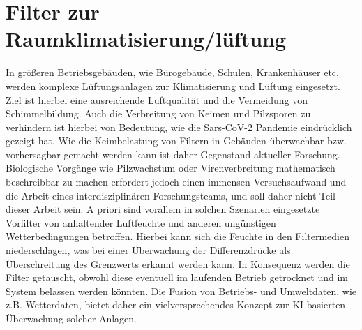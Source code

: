 \section{Filter zur Raumklimatisierung/lüftung}
In größeren Betriebsgebäuden, wie Bürogebäude, Schulen, Krankenhäuser etc. werden komplexe Lüftungsanlagen zur Klimatisierung und Lüftung eingesetzt. Ziel ist hierbei eine ausreichende Luftqualität und die Vermeidung von Schimmelbildung. Auch die Verbreitung von Keimen und Pilzsporen zu verhindern ist hierbei von Bedeutung, wie die Sars-CoV-2 Pandemie eindrücklich gezeigt hat.
Wie die Keimbelastung von Filtern in Gebäuden überwachbar bzw. vorhersagbar gemacht werden kann ist daher Gegenstand aktueller Forschung. Biologische Vorgänge wie Pilzwachstum oder Virenverbreitung mathematisch beschreibbar zu machen erfordert jedoch einen immensen Versuchsaufwand und die Arbeit eines interdisziplinären Forschungsteams, und soll daher nicht Teil dieser Arbeit sein.\newline
A priori sind vorallem in solchen Szenarien eingesetzte Vorfilter von anhaltender Luftfeuchte und anderen ungünstigen Wetterbedingungen betroffen. Hierbei kann sich die Feuchte in den Filtermedien niederschlagen, was bei einer Überwachung der Differenzdrücke als Überschreitung des Grenzwerts erkannt werden kann. In Konsequenz werden die Filter getauscht, obwohl diese eventuell im laufenden Betrieb getrocknet und im System belassen werden könnten. Die Fusion von Betriebs- und Umweltdaten, wie z.B. Wetterdaten, bietet daher ein vielversprechendes Konzept zur KI-basierten Überwachung solcher Anlagen.
